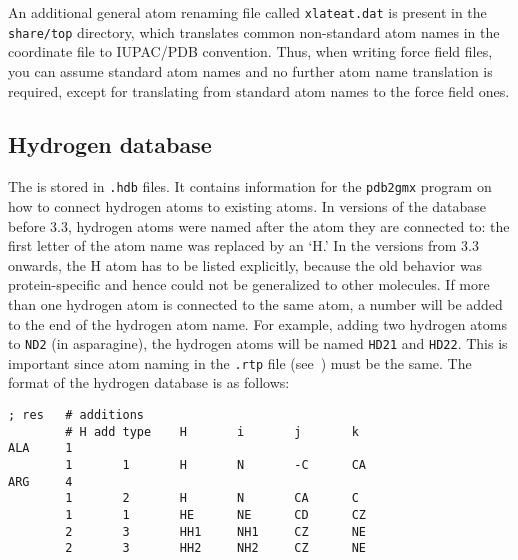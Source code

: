 An additional general atom renaming file called {\tt xlateat.dat} is present
in the {\tt share/top} directory, which translates common non-standard
atom names in the coordinate file to IUPAC/PDB convention. Thus, when writing
force field files, you can assume standard atom names and no further
atom name translation is required, except for translating from standard atom names
to the force field ones.

\subsection{Hydrogen database}
\label{subsec:hdb}
The  is stored in {\tt .hdb} files. It
contains information for the {\tt pdb2gmx} program on how to connect
hydrogen atoms to existing atoms. In versions of the database before
{\gromacs} 3.3, hydrogen atoms were named after the atom they are
connected to: the first letter of the atom name was replaced by an
`H.' In the versions from 3.3 onwards, the H atom has to be listed explicitly,
because the old behavior was protein-specific and hence could not
be generalized to other molecules.
If more than one hydrogen atom is connected to the same atom, a
number will be added to the end of the hydrogen atom name. For
example, adding two hydrogen atoms to \texttt{ND2} (in asparagine), the
hydrogen atoms will be named \texttt{HD21} and \texttt{HD22}. This is
important since atom naming in the \texttt{.rtp} file (see~)
must be the same. The format of the hydrogen database is as follows:

{\small
\begin{verbatim}
; res   # additions
        # H add type    H       i       j       k
ALA     1
        1       1       H       N       -C      CA
ARG     4
        1       2       H       N       CA      C
        1       1       HE      NE      CD      CZ
        2       3       HH1     NH1     CZ      NE
        2       3       HH2     NH2     CZ      NE
\end{verbatim}}

